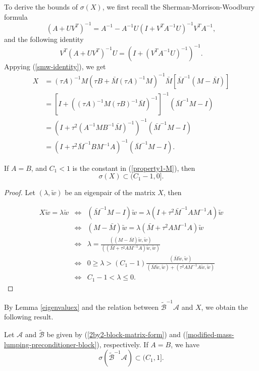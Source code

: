 \documentclass[smallcondensed]{svjour3}
\numberwithin{equation}{section} \numberwithin{table}{section}
\numberwithin{figure}{section}
\numberwithin{algorithm}{section}
\begin{document}
To derive the bounds of $\sigma(X)$, we first recall the Sherman-Morrison-Woodbury formula
$$
(A+UV^{T})^{-1} = A^{-1}-A^{-1}U(I+V^{T}A^{-1}U)^{-1}V^{T}A^{-1},
$$ 
and the following identity
\begin{equation}
V^{T}(A+UV^T)^{-1}U=(I+(V^{T}A^{-1}U)^{-1})^{-1}.
\label{smw-identity}
\end{equation}
Appying (\ref{smw-identity}), we get
\begin{align*}
X &= (\tau A)^{-1}M(\tau B+\bar{M}(\tau A)^{-1}M)^{-1}\bar{M}[\bar{M}^{-1}({M}-\bar M)]\\[5pt]
   & = \left[I+((\tau A)^{-1}M(\tau B)^{-1}\bar{M})^{-1}\right]^{-1}(\bar{M}^{-1}M-I)\\[5pt]
   & = \left(I+\tau^2(A^{-1}MB^{-1}\bar{M})^{-1}\right)^{-1}(\bar{M}^{-1}M-I)\\
   & = \left(I+\tau^2\bar{M}^{-1}BM^{-1}A\right)^{-1}(\bar{M}^{-1}M-I).
\end{align*}

\begin{lemma}[spectrum of X] \label{eigenvaluex}
If $A = B$, and $C_1<1$ is the constant in (\ref{property1-M}), then
$$
\sigma(X)\subset(C_1-1,0].
$$
\end{lemma}
\begin{proof}
Let $(\lambda, \utilde w)$ be an eigenpair of the matrix $X$, then

\begin{eqnarray*}
X\utilde w =\lambda \utilde w &\Leftrightarrow& (\bar M^{-1}M-I)\utilde w = \lambda (I+\tau^2 \bar M^{-1}A M^{-1} A)\utilde w\\
&\Leftrightarrow& (M-\bar M)\utilde w = \lambda (\bar M+\tau^2 A M^{-1} A)\utilde w\\
&\Leftrightarrow &\lambda = \frac{((M-\bar M)\utilde w,\utilde w)}{((\bar M+\tau^2 A M^{-1} A)\utilde w,\utilde w)}\\
&\Leftrightarrow& 0\geq\lambda> (C_1-1)\frac{(\bar M\utilde w, \utilde w)}{(\bar M\utilde w,\utilde w)+(\tau^2A M^{-1}A\utilde w,\utilde w)}\\
&\Leftrightarrow& C_1-1<\lambda\leq 0.
\end{eqnarray*}
\end{proof}

By Lemma \ref{eigenvaluex} and the relation between $\tilde{\mathcal{B}}^{-1} \mathcal{A}$ and $X$, we obtain the following result.

\begin{theorem} \label{eigentBA}
Let $\mathcal{A}$ and $\tilde{\mathcal{B}}$ be given by (\ref{2by2-block-matrix-form}) and (\ref{modified-mass-lumping-preconditioner-block}), respectively. If $A=B$, we have 
$$
\sigma( \tilde{\mathcal{B}}^{-1} \mathcal{A} ) \subset(C_1, 1].
$$
\end{theorem}
\end{document}
